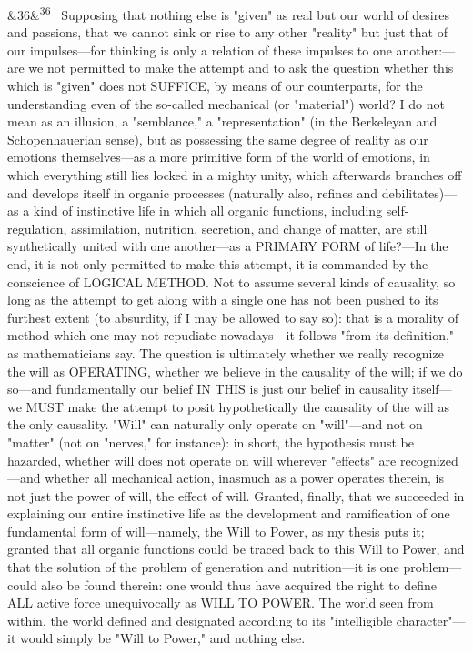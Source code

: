 \documentclass[12pt]{article}
\newcommand{\para}[1][]{\par\noindent\ifx&#1&\else\textsuperscript{\footnotesize #1}~\fi}
\begin{document}
\para[36] Supposing that nothing else is "given" as real but our world of desires and passions, that we cannot sink or rise to any other "reality" but just that of our impulses---for thinking is only a relation of these impulses to one another:---are we not permitted to make the attempt and to ask the question whether this which is "given" does not SUFFICE, by means of our counterparts, for the understanding even of the so-called mechanical (or "material") world? I do not mean as an illusion, a "semblance," a "representation" (in the Berkeleyan and Schopenhauerian sense), but as possessing the same degree of reality as our emotions themselves---as a more primitive form of the world of emotions, in which everything still lies locked in a mighty unity, which afterwards branches off and develops itself in organic processes (naturally also, refines and debilitates)---as a kind of instinctive life in which all organic functions, including self-regulation, assimilation, nutrition, secretion, and change of matter, are still synthetically united with one another---as a PRIMARY FORM of life?---In the end, it is not only permitted to make this attempt, it is commanded by the conscience of LOGICAL METHOD. Not to assume several kinds of causality, so long as the attempt to get along with a single one has not been pushed to its furthest extent (to absurdity, if I may be allowed to say so): that is a morality of method which one may not repudiate nowadays---it follows "from its definition," as mathematicians say. The question is ultimately whether we really recognize the will as OPERATING, whether we believe in the causality of the will; if we do so---and fundamentally our belief IN THIS is just our belief in causality itself---we MUST make the attempt to posit hypothetically the causality of the will as the only causality. "Will" can naturally only operate on "will"---and not on "matter" (not on "nerves," for instance): in short, the hypothesis must be hazarded, whether will does not operate on will wherever "effects" are recognized---and whether all mechanical action, inasmuch as a power operates therein, is not just the power of will, the effect of will. Granted, finally, that we succeeded in explaining our entire instinctive life as the development and ramification of one fundamental form of will---namely, the Will to Power, as my thesis puts it; granted that all organic functions could be traced back to this Will to Power, and that the solution of the problem of generation and nutrition---it is one problem---could also be found therein: one would thus have acquired the right to define ALL active force unequivocally as WILL TO POWER. The world seen from within, the world defined and designated according to its "intelligible character"---it would simply be "Will to Power," and nothing else.
\end{document}

